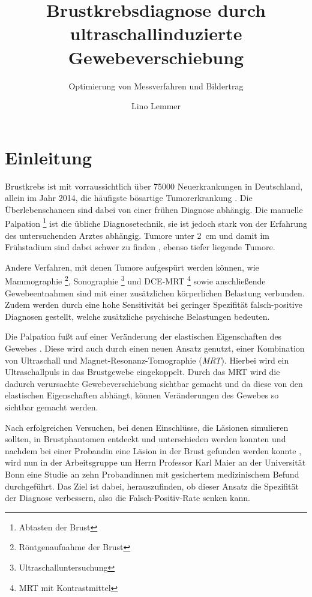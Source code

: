 \documentclass[
    11pt,
    ngerman
]{scrbook}
\author{Lino Lemmer}
\title{Brustkrebsdiagnose durch ultraschallinduzierte Gewebeverschiebung}
\subtitle{Optimierung von Messverfahren und Bildertrag}
\begin{document}
\maketitle


\tableofcontents

\chapter{Einleitung}

Brustkrebs ist mit vorraussichtlich über 75000 Neuerkrankungen in Deutschland,
allein im Jahr 2014, die häufigste bösartige Tumorerkrankung
\parencite[68]{krebs_in_deutschland}. Die Überlebenschancen sind dabei von
einer frühen Diagnose abhängig. Die manuelle Palpation \footnote{Abtasten der
Brust} ist die übliche Diagnosetechnik, sie ist jedoch stark von der Erfahrung
des untersuchenden Arztes abhängig. Tumore unter \SI{2}{\centi\meter} und
damit im Frühstadium sind dabei schwer zu finden
\parencite{diagnostik_mammakarzinom}, ebenso tiefer liegende Tumore.

Andere Verfahren, mit denen Tumore aufgespürt werden können, wie Mammographie
\footnote{Röntgenaufnahme der Brust}, Sonographie
\footnote{Ultraschalluntersuchung} und DCE-MRT \footnote{MRT mit
Kontrastmittel} sowie anschließende Gewebeentnahmen sind mit einer zusätzlichen
körperlichen Belastung verbunden. Zudem werden durch eine hohe Sensitivität bei
geringer Spezifität falsch-positive Diagnosen gestellt, welche zusätzliche
psychische Belastungen bedeuten.

Die Palpation fußt auf einer Veränderung der elastischen Eigenschaften des
Gewebes \parencite{elastic_moduli_breast_tissue}.
Diese wird auch durch einen neuen Ansatz genutzt, einer Kombination
von Ultraschall und Magnet-Resonanz-Tomographie (\emph{MRT}). Hierbei wird ein
Ultraschallpuls in das Brustgewebe eingekoppelt. Durch das MRT wird die dadurch
verursachte Gewebeverschiebung sichtbar gemacht und da diese von den
elastischen Eigenschaften abhängt, können Veränderungen des Gewebes so sichtbar
gemacht werden.

Nach erfolgreichen Versuchen, bei denen Einschlüsse, die Läsionen simulieren
sollten, in Brustphantomen entdeckt und unterschieden werden konnten
\parencite{dipl_ulucay} und nachdem bei einer Probandin eine Läsion in der
Brust gefunden werden konnte \parencite{diss_mende}, wird nun in der
Arbeitsgruppe um Herrn Professor Karl Maier an der Universität Bonn eine Studie
an zehn Probandinnen mit gesichertem medizinischem Befund durchgeführt. Das
Ziel ist dabei, herauszufinden, ob dieser Ansatz die Spezifität der Diagnose
verbessern, also die Falsch-Positiv-Rate senken kann.
\end{document}
